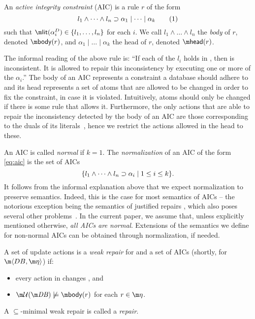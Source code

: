\begin{definition}
 An \emph{active integrity constraint} (AIC) is a rule $r$ of the form
  \begin{equation} l_1\land \dots\land l_n\supset \alpha_1\mid\dots \mid \alpha_k \tag{1}\label{eq:aic}\end{equation}
  such that $\litof(\alpha_i^D) \in \{l_1,\dots,l_n\}$ for each $i$.
%  
  We call $l_1\land \dots \land l_n$ the \emph{body} of $r$, denoted $\body(r)$, and $\alpha_1\mid\dots \mid \alpha_k$ the head of $r$, denoted $\head (r)$.
\end{definition}

The informal reading of the above rule is: ``If each of the $l_i$ holds in \db, then \db is inconsistent. 
It is allowed to repair this inconsistency by executing one or more of the $\alpha_i$.''
The body of an AIC represents a constraint a database should adhere to and its head represents a set of atoms that are allowed to be changed in order to fix the constraint, in case it is violated. 
Intuitively, atoms should only be changed if there is some rule that allows it.
Furthermore, the only actions that are able to repair the inconsistency detected by the body of an AIC are those corresponding to the duals of its literals~\cite{iclp/CaropreseGSZ06}, hence we restrict the actions allowed in the head to these.


An AIC is called \emph{normal} if $k=1$. The \emph{normalization} of an AIC of the form \eqref{eq:aic} is the set of AICs 
\[\{l_1\land \dots\land l_n\supset \alpha_i\mid 1\leq i\leq k\}.\]
It follows from the informal explanation above that we expect normalization to preserve semantics. Indeed, this is the case for most semantics of AICs -- the notorious exception being the semantics of justified repairs \cite{tplp/CaropreseT11}, which also poses several other problems~\cite{tase/Cruz-FilipeGEN13}.
In the current paper, we assume that, unless explicitly mentioned otherwise, \emph{all AICs are normal}. Extensions of the semantics we define for non-normal AICs can be obtained through normalization, if needed.

\begin{definition}
 A set of update actions \UU is a \emph{weak repair} for \db and a set \aics of AICs (shortly, for $\fulldb$) if:
 \begin{itemize}
  \item every action in \UU changes \db, and 
  \item $\UU(\db)\not\models \body(r)$ for each $r\in\aics$.
 \end{itemize}
A $\subseteq$-minimal weak repair is called a \emph{repair}.
\end{definition}

